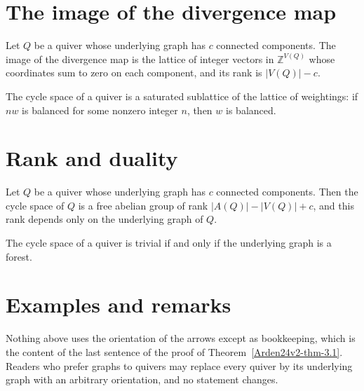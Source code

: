 \section{The image of the divergence map}\label{Arden24v2-sec-2}

\begin{proposition}\label{Arden24v2-prop-2.1}
\label{Arden24v2-prop:image}
Let $Q$ be a quiver whose underlying graph has $c$ connected components. The image of the divergence map is the lattice of integer vectors in $\mathbb{Z}^{V(Q)}$ whose coordinates sum to zero on each component, and its rank is $|V(Q)| - c$.
\end{proposition}

\begin{lemma}\label{Arden24v2-lem-2.2}
\label{Arden24v2-lem:saturated}
The cycle space of a quiver is a saturated sublattice of the lattice of weightings: if $nw$ is balanced for some nonzero integer $n$, then $w$ is balanced.
\end{lemma}

\section{Rank and duality}\label{Arden24v2-sec-3}

\begin{theorem}\label{Arden24v2-thm-3.1}
\label{Arden24v2-thm:rank}
Let $Q$ be a quiver whose underlying graph has $c$ connected components. Then the cycle space of $Q$ is a free abelian group of rank $|A(Q)| - |V(Q)| + c$, and this rank depends only on the underlying graph of $Q$.
\end{theorem}

\begin{corollary}\label{Arden24v2-cor-3.2}
\label{Arden24v2-cor:forest}
The cycle space of a quiver is trivial if and only if the underlying graph is a forest.
\end{corollary}

\section{Examples and remarks}\label{Arden24v2-sec-4}

\begin{remark}\label{Arden24v2-rem-4.1}
\label{Arden24v2-rem:orientation}
Nothing above uses the orientation of the arrows except as bookkeeping, which is the content of the last sentence of the proof of Theorem~\ref{Arden24v2-thm-3.1}. Readers who prefer graphs to quivers may replace every quiver by its underlying graph with an arbitrary orientation, and no statement changes.
\end{remark}

